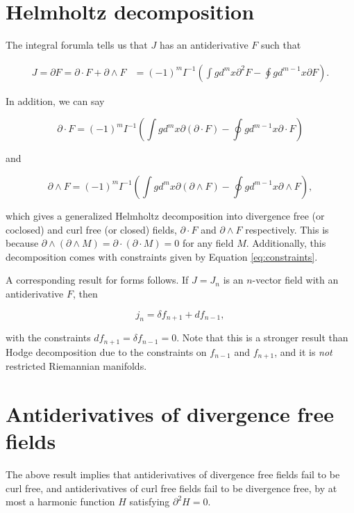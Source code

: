 \documentclass{article}
\begin{document}
\section{Helmholtz decomposition}

The integral forumla tells us that $J$ has an antiderivative $F$ such that

\begin{align}
  J = \partial F = \partial \cdot F + \partial \wedge F &= (-1)^m I^{-1} \left(\int g d^{m}x \partial^2 F - \oint g d^{m-1}x \partial F\right).\label{eq:helmholtz}
\end{align}

In addition, we can say

\begin{equation}
  \partial \cdot F = (-1)^m I^{-1} \left(\int g d^{m}x \partial (\partial \cdot F) - \oint g d^{m-1}x \partial \cdot F\right)
\end{equation}

and

\begin{equation}
  \partial \wedge F = (-1)^m I^{-1} \left(\int g d^{m}x \partial (\partial \wedge F) - \oint g d^{m-1}x \partial \wedge F\right),
\end{equation}

which gives a generalized Helmholtz decomposition into divergence free (or coclosed) and curl free (or closed) fields, $\partial \cdot F$ and $\partial \wedge F$ respectively. This is because $\partial \wedge (\partial \wedge M) = \partial \cdot (\partial \cdot M) = 0$ for any field $M$. Additionally, this decomposition comes with constraints given by Equation \ref{eq:constraints}.

A corresponding result for forms follows. If $J = J_n$ is an $n$-vector field with an antiderivative $F$, then

\begin{equation}
  j_n = \delta f_{n+1} + d f_{n-1},
\end{equation}

with the constraints $df_{n+1}=\delta f_{n-1} = 0$. Note that this is a stronger result than Hodge decomposition due to the constraints on $f_{n-1}$ and $f_{n+1}$, and it is \emph{not} restricted Riemannian manifolds.

\section{Antiderivatives of divergence free fields} The above result implies that antiderivatives of divergence free fields fail to be curl free, and antiderivatives of curl free fields fail to be divergence free, by at most a harmonic function $H$ satisfying $\partial^2 H = 0$.
\end{document}

